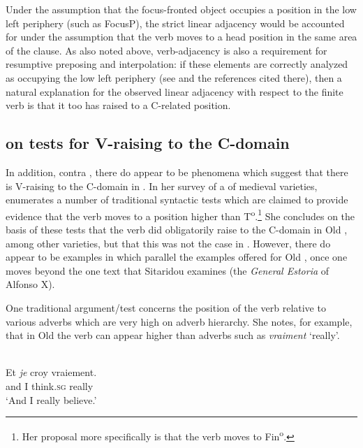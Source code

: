 \documentclass[output=paper]{LSP/langsci}
\begin{document}
\noindent Under the assumption that the focus-fronted object occupies a position in the low left periphery (such as FocusP), the strict linear adjacency would be accounted for under the assumption that the verb moves to a head position in the same area of the clause.  As also noted above, verb-adjacency is also a requirement for resumptive preposing and interpolation:  if these elements are correctly analyzed as occupying the low left periphery (see \citealt[Section~3]{Sitaridou2011} and the references cited there), then a natural explanation for the observed linear adjacency with respect to the finite verb is that it too has raised to a C-related position.  

\subsection{\citet{Sitaridou2012} on tests for V-raising to the C-domain}\label{sec:poole:3.3}
In addition, contra \citealt{Sitaridou2012}, there do appear to be phenomena which suggest that there is V-raising to the C-domain in .  In her survey of a  of medieval  varieties, \citet{Sitaridou2012} enumerates a number of traditional syntactic tests which are claimed to provide evidence that the verb moves to a position higher than T\textsuperscript{o}.\footnote{Her proposal more specifically is that the verb moves to Fin\textsuperscript{o}.}  She concludes on the basis of these tests that the verb did obligatorily raise to the C-domain in Old , among other varieties, but that this was not the case in .  However, there do appear to be examples in  which parallel the examples offered for Old , once one moves beyond the one text that Sitaridou examines (the \textit{General Estoria} of Alfonso X).  

One traditional argument/test concerns the position of the verb relative to various adverbs which are very high on  adverb hierarchy.  She notes, for example, that in Old  the verb can appear higher than adverbs such as \textit{vraiment} ‘really’.

\ea%
    \label{ex:poole:18}
    \citep[(52b)]{Sitaridou2012}\\
    \gll Et \textit{je} croy vraiement.  \\
         and I think.\textsc{sg} really\\
    \glt ‘And I really believe.’ 
\z
\end{document}
